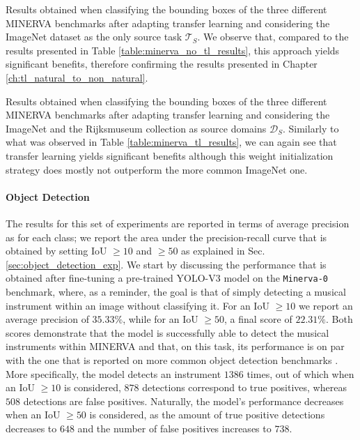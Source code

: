 \begin{table}[ht!]
	\caption{Results obtained when classifying the bounding boxes of the three different MINERVA benchmarks after adapting transfer learning and considering the ImageNet dataset as the only source task $\mathcal{T}_S$. We observe that, compared to the results presented in Table \ref{table:minerva_no_tl_results}, this approach yields significant benefits, therefore confirming the results presented in Chapter \ref{ch:tl_natural_to_non_natural}.}
\resizebox{\columnwidth}{!}{%
}
\label{table:minerva_tl_results}
\end{table}


\begin{table}[ht!]
	\caption{Results obtained when classifying the bounding boxes of the three different MINERVA benchmarks after adapting transfer learning and considering the ImageNet and the Rijksmuseum collection as source domains $\mathcal{D}_S$. Similarly to what was observed in Table \ref{table:minerva_tl_results}, we can again see that transfer learning yields significant benefits although this weight initialization strategy does mostly not outperform the more common ImageNet one.}
\resizebox{\columnwidth}{!}{%
}
\label{table:minerva_rijks_results}
\end{table}


\paragraph{Object Detection}
The results for this set of experiments are reported in terms of average precision as for each class; we report the area under the precision-recall curve that is obtained by setting IoU $\geq10$ and $\geq50$ as explained in Sec. \ref{sec:object_detection_exp}. We start by discussing the performance that is obtained after fine-tuning a pre-trained YOLO-V3 model on the \texttt{Minerva-0} benchmark, where, as a reminder, the goal is that of simply detecting a musical instrument within an image without classifying it. For an IoU $\geq 10$ we report an average precision of $35.33\%$, while for an IoU $\geq 50$, a final score of $22.31\%$. Both scores demonstrate that the model is successfully able to detect the musical instruments within MINERVA and that, on this task, its performance is on par with the one that is reported on more common object detection benchmarks \cite{}. More specifically, the model detects an instrument $1386$ times, out of which when an IoU $\geq 10$ is considered, $878$ detections correspond to true positives, whereas $508$ detections are false positives. Naturally, the model's performance decreases when an IoU $\geq 50$ is considered, as the amount of true positive detections decreases to $648$ and the number of false positives increases to $738$.


